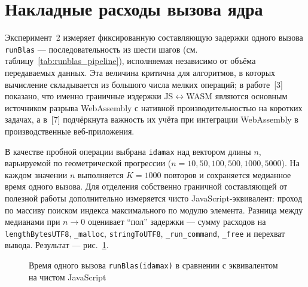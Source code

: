 \documentclass[12pt, oneside]{book}
\begin{document}
\section{Накладные расходы вызова ядра}
\label{sec:exp_boundary}

    \quad Эксперимент~2 измеряет фиксированную составляющую задержки одного вызова \texttt{runBlas} --- последовательность из шести шагов (см. таблицу~\ref{tab:runblas_pipeline}), исполняемая независимо от объёма передаваемых данных. Эта величина критична для алгоритмов, в которых вычисление складывается из большого числа мелких операций; в работе~[3] показано, что именно граничные издержки JS$\leftrightarrow$WASM являются основным источником разрыва WebAssembly с нативной производительностью на коротких задачах, а в~[7] подчёркнута важность их учёта при интеграции WebAssembly в производственные веб-приложения.

    \quad В качестве пробной операции выбрана \texttt{idamax} над вектором длины $n$, варьируемой по геометрической прогрессии ($n = 10, 50, 100, 500, 1000, 5000$). На каждом значении $n$ выполняется $K = 1000$ повторов и сохраняется медианное время одного вызова. Для отделения собственно граничной составляющей от полезной работы дополнительно измеряется чисто JavaScript-эквивалент: проход по массиву поиском индекса максимального по модулю элемента. Разница между медианами при $n \to 0$ оценивает ``пол'' задержки --- сумму расходов на \texttt{lengthBytesUTF8}, \texttt{\_malloc}, \texttt{stringToUTF8}, \texttt{\_run\_command}, \texttt{\_free} и перехват вывода. Результат --- рис.~\ref{fig:exp_boundary}.

\begin{figure}[htbp]
\centering
{}
\caption{Время одного вызова \texttt{runBlas(idamax)} в сравнении с эквивалентом на чистом JavaScript}
\label{fig:exp_boundary}
\end{figure}
\end{document}
